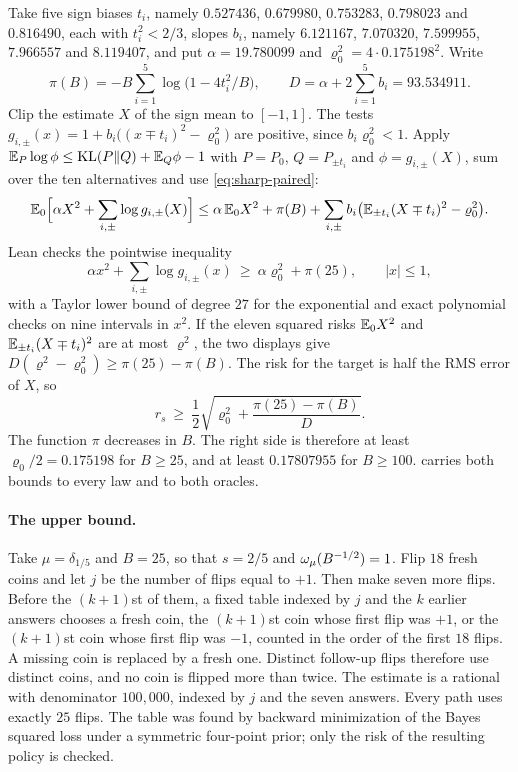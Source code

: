 Take five sign biases $t_i$, namely $0.527436$, $0.679980$, $0.753283$,
$0.798023$ and $0.816490$, each with $t_i^2<2/3$, slopes $b_i$, namely
$6.121167$, $7.070320$, $7.599955$, $7.966557$ and $8.119407$, and put
$\alpha=19.780099$ and $\varrho_0^2=4\cdot0.175198^2$. Write
\[
 \pi(B)=-B\sum_{i=1}^5\log\bigl(1-4t_i^2/B\bigr),\qquad
 D=\alpha+2\sum_{i=1}^5b_i=93.534911 .
\]
Clip the estimate $X$ of the sign mean to $[-1,1]$. The tests
$g_{i,\pm}(x)=1+b_i\bigl((x\mp t_i)^2-\varrho_0^2\bigr)$ are positive,
since $b_i\varrho_0^2<1$. Apply
$\mathbb E_P\log\phi\le\operatorname{KL}(P\Vert Q)+\mathbb E_Q\phi-1$ with $P=P_0$,
$Q=P_{\pm t_i}$ and $\phi=g_{i,\pm}(X)$, sum over the ten alternatives
and use \eqref{eq:sharp-paired}:
\[
 \mathbb E_0\Bigl[\alpha X^2+\sum_{i,\pm}\log g_{i,\pm}(X)\Bigr]
 \le \alpha\,\mathbb E_0X^2+\pi(B)
 +\sum_{i,\pm}b_i\bigl(\mathbb E_{\pm t_i}(X\mp t_i)^2-\varrho_0^2\bigr).
\]
Lean checks the pointwise inequality
\begin{equation}\label{eq:sharp-five}
 \alpha x^2+\sum_{i,\pm}\log g_{i,\pm}(x)\ \ge\ \alpha\varrho_0^2+\pi(25),\qquad |x|\le1,
\end{equation}
with a Taylor lower bound of degree $27$ for the exponential and exact
polynomial checks on nine intervals in $x^2$. If the eleven squared
risks $\mathbb E_0X^2$ and $\mathbb E_{\pm t_i}(X\mp t_i)^2$ are at most $\varrho^2$, the
two displays give $D(\varrho^2-\varrho_0^2)\ge\pi(25)-\pi(B)$. The risk for
the target is half the RMS error of $X$, so
\[
 r_s\ \ge\ \frac12\sqrt{\varrho_0^2+\frac{\pi(25)-\pi(B)}{D}} .
\]
The function $\pi$ decreases in $B$. The right side is therefore at
least $\varrho_0/2=0.175198$ for $B\ge25$, and at least $0.17807955$ for
$B\ge100$.  carries both bounds to every law
and to both oracles.

\paragraph{The upper bound.}
Take $\mu=\delta_{1/5}$ and $B=25$, so that $s=2/5$ and
$\omega_\mu(B^{-1/2})=1$. Flip $18$ fresh coins and let $j$ be the number of
flips equal to $+1$. Then make seven more flips. Before the $(k+1)$st of
them, a fixed table indexed by $j$ and the $k$ earlier answers chooses a
fresh coin, the $(k+1)$st coin whose first flip was $+1$, or the
$(k+1)$st coin whose first flip was $-1$, counted in the order of the
first $18$ flips. A missing coin is replaced by a fresh one. Distinct
follow-up flips therefore use distinct coins, and no coin is flipped more
than twice. The estimate is a rational with denominator $100{,}000$,
indexed by $j$ and the seven answers. Every path uses exactly $25$
flips. The table was found by backward minimization of the Bayes squared
loss under a symmetric four-point prior; only the risk of the resulting
policy is checked.

